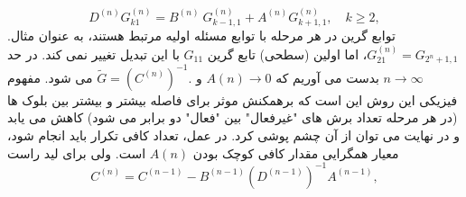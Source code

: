 \begin{equation}
	{{D}^{(n)}}G_{k1}^{(n)}={{B}^{(n)}}\ G_{k-1,1}^{(n)}+{{A}^{(n)}}G_{k+1,1}^{(n)},\quad k\ge 2,
\end{equation}
توابع گرین در هر مرحله با توابع مسئله اولیه مرتبط هستند، به عنوان مثال. $G_{21}^{(n)}={{G}_{{{2}^{n}}+1,1}}$، اما اولین (سطحی) تابع گرین $G_{11}$ با این تبدیل تغییر نمی کند.
در حد $n\to\infty$ بدست می آوریم که $A(n) \rightarrow 0$ و $\tilde{G}={{\left( {{C}^{(n)}} \right)}^{-1}}.$ می شود. مفهوم فیزیکی این روش این است که برهمکنش موثر برای فاصله بیشتر و بیشتر بین بلوک ها (در هر مرحله تعداد برش های "غیرفعال" بین "فعال" دو برابر می شود) کاهش می یابد و در نهایت می توان از آن چشم پوشی کرد. در عمل، تعداد کافی تکرار باید انجام شود، معیار همگرایی مقدار کافی کوچک بودن $A(n)$ است.
ولی برای لید راست 
\begin{equation}
    {{C}^{(n)}}={{C}^{(n-1)}}-{{B}^{(n-1)}}{{({{D}^{(n-1)}})}^{-1}}{{A}^{(n-1)}},
\end{equation}